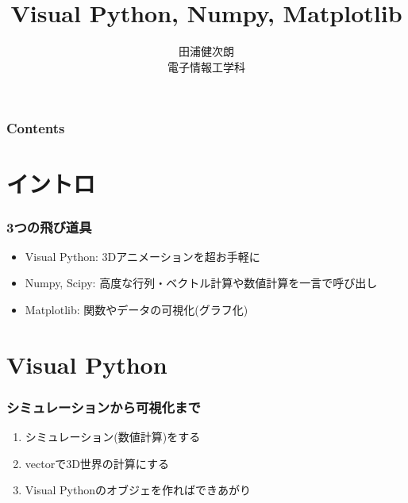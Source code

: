 \documentclass[10pt,dvipdfmx]{beamer}
\title{Visual Python, Numpy, Matplotlib}
\institute{東京大学}
\author{田浦健次朗 \\ 電子情報工学科}
\date{}
\begin{document}
\maketitle

\begin{frame}
\frametitle{Contents}
\tableofcontents
\end{frame}

\section{イントロ}

\begin{frame}
\frametitle{3つの飛び道具}
\begin{itemize}
\item Visual Python: 3Dアニメーションを超お手軽に
\item Numpy, Scipy: 高度な行列・ベクトル計算や数値計算を一言で呼び出し
\item Matplotlib: 関数やデータの可視化(グラフ化)
\end{itemize}
\end{frame}


\section{Visual Python}

\begin{frame}[fragile]
\frametitle{シミュレーションから可視化まで}

\begin{enumerate}
\item シミュレーション(数値計算)をする
\item vectorで3D世界の計算にする
\item Visual Pythonのオブジェを作ればできあがり
\end{enumerate}

\end{frame}
\end{document}
